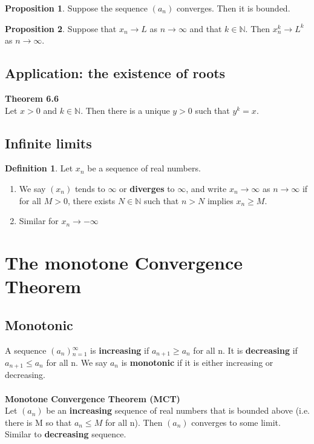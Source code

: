\documentclass{article}
\theoremstyle{definition}
\newtheorem{definition}{Definition}[section]
\newtheorem{proposition}{Proposition}[definition]
\theoremstyle{definition}
\theoremstyle{remark}
\begin{document}
\begin{proposition}
    Suppose the sequence $(a_{n})$ converges. Then it is bounded.
\end{proposition}

\begin{proposition}
    Suppose that $x_{n} \rightarrow L$ as $n \rightarrow \infty$ and that $k \in \mathbb{N}$. Then $x{_{n}^{k}} \rightarrow L^{k}$ as $n \rightarrow \infty$.\\
\end{proposition}

\subsection {Application: the existence of roots}
\textbf{Theorem 6.6}\\
Let $x>0$ and $k \in \mathbb{N}$. Then there is a unique $y>0$ such that $y^{k}=x$.\\

\subsection {Infinite limits}

\begin{definition}
Let ${x_{n}}$ be a sequence of real numbers.

\begin{enumerate}
	\item  We say $(x_{n})$ tends to $\infty$ or \textbf{diverges} to $\infty$, and write $x_{n}\rightarrow \infty$ as $n \rightarrow \infty$ if for all $M > 0$, there exists $N \in \mathbb{N}$ such that $n>N$ implies $x_{n}\geq M$.\\

	\item  Similar for $x_{n} \rightarrow -\infty$
\end{enumerate}
\end{definition}

\section{The monotone Convergence Theorem}
\subsection{Monotonic}
A sequence $(a_{n}){_{n=1}^{\infty}}$ is \textbf{increasing} if $a_{n+1} \geq a_{n} $ for all n. It is \textbf{decreasing} if $a_{n+1}\leq a_{n}$ for all n. We say ${a_n}$ is \textbf{monotonic} if it is either increasing or decreasing. \\
\\
\textbf{Monotone Convergence Theorem (MCT)}\\
Let $(a_{n})$ be an \textbf{increasing} sequence of real numbers that is bounded above (i.e. there is M so that $a_{n}\leq M$ for all n). Then $(a_{n})$ converges to some limit.\\
Similar to \textbf{decreasing} sequence. \\
\end{document}
